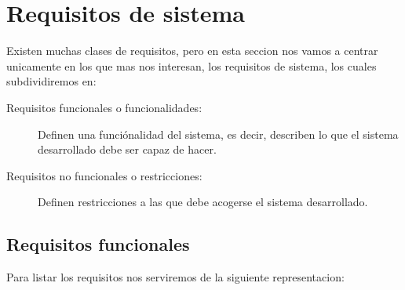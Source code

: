 \chapter{Requisitos de sistema}

    Existen muchas clases de requisitos, pero en esta seccion nos vamos a centrar unicamente en los que mas nos interesan, los requisitos de sistema, los cuales subdividiremos en:
    \begin{description}
        \item[Requisitos funcionales o funcionalidades:]
            Definen una funciónalidad del sistema, es decir, describen lo que el sistema desarrollado debe ser capaz de hacer.
        \item[Requisitos no funcionales o restricciones:]
            Definen restricciones a las que debe acogerse el sistema desarrollado.
    \end{description}
  

\section{Requisitos funcionales}
    Para listar los requisitos nos serviremos de la siguiente representacion:
    
    
    
    
    
    
    
    
    
    
    
    
    
    
    
    
    
    
    
    
    
    
    
    
    
    
    
    
    
    
    
    
     
